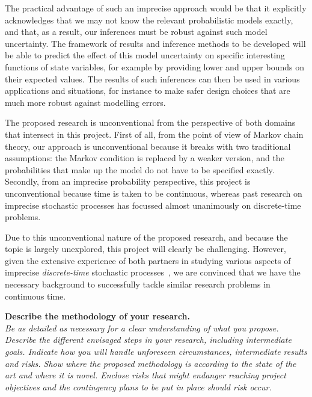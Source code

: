 \documentclass[11pt,dvipsnames,usenames,a4paper]{article}
\begin{document}
The practical advantage of such an imprecise approach would be that it explicitly acknowledges that we may not know the relevant probabilistic models exactly, and that, as a result, our inferences must be robust against such model uncertainty. 
The framework of results and inference methods to be developed will be able to predict the effect of this model uncertainty on specific interesting functions of state variables, for example by providing lower and upper bounds on their expected values. 
The results of such inferences can then be used in various applications and situations, for instance to make safer design choices that are much more robust against modelling errors.

The proposed research is unconventional from the perspective of both domains that intersect in this project.
First of all, from the point of view of Markov chain theory, our approach is unconventional because it breaks with two traditional assumptions: the Markov condition is replaced by a weaker version, and the probabilities that make up the model do not have to be specified exactly. Secondly, from an imprecise probability perspective, this project is unconventional because time is taken to be continuous, whereas past research on imprecise stochastic processes has focussed almost unanimously on discrete-time problems.

Due to this unconventional nature of the proposed research, and because the topic is largely unexplored, this project will clearly be challenging. 
However, given the extensive experience of both partners in studying various aspects of imprecise \emph{discrete-time} stochastic processes~\cite{cooman2007d,cooman2008,hermans2012,cooman2015:markovergodic,cooman2015:isipta:markov}, we are convinced that we have the necessary background to successfully tackle similar research problems in continuous time.


\vspace{7pt}

\textbf{Describe the methodology of your research.}\\
\textit{Be as detailed as necessary for a clear understanding of what you propose.
Describe the different envisaged steps in your research, including intermediate goals. Indicate how you will handle unforeseen circumstances, intermediate results and risks.
Show where the proposed methodology is according to the state of the art and where it is novel.
Enclose risks that might endanger reaching project objectives and the contingency plans to be put in place should risk occur.}
\end{document}
